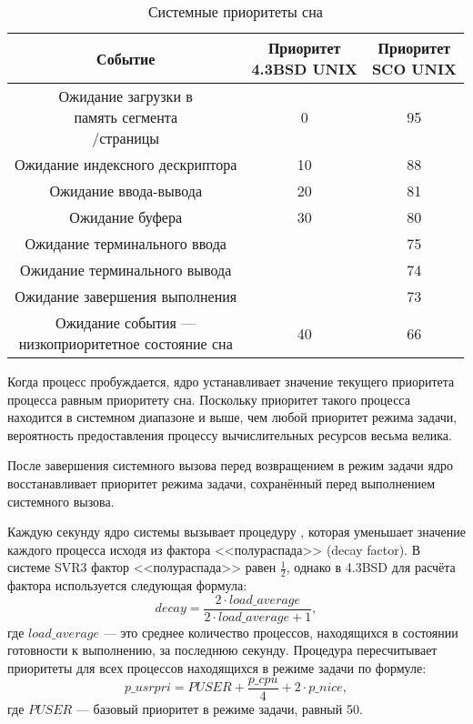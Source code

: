 \begin{table}[H]
  \centering
  \caption{Системные приоритеты сна}
  \begin{tabular}{|c|c|c|}
    \hline
    Событие & \makecell{Приоритет \\4.3BSD UNIX} & \makecell{Приоритет \\SCO UNIX} \\
    \hline
    \makecell{Ожидание загрузки в \\память сегмента\\/страницы} & 0 & 95 \\
    \hline
    Ожидание индексного дескриптора & 10 & 88 \\
    \hline
    Ожидание ввода-вывода & 20 & 81 \\
    \hline
    Ожидание буфера & 30 & 80 \\
    \hline
    Ожидание терминального ввода & & 75 \\
    \hline
    Ожидание терминального вывода & & 74 \\
    \hline
    Ожидание завершения выполнения & & 73 \\
    \hline
    \makecell{Ожидание события --- \\низкоприоритетное состояние сна} & 40 & 66 \\
    \hline
  \end{tabular}
  \label{tbl:sleep}
\end{table}

Когда процесс пробуждается, ядро устанавливает значение текущего приоритета процесса
равным приоритету сна. Поскольку приоритет такого процесса находится в системном 
диапазоне и выше, чем любой приоритет режима задачи, вероятность
предоставления процессу вычислительных ресурсов весьма велика.

После завершения системного вызова перед возвращением в режим задачи
ядро восстанавливает приоритет режима задачи, сохранённый
перед выполнением системного вызова.

Каждую секунду ядро системы вызывает процедуру , которая
уменьшает значение  каждого процесса исходя из фактора <<полураспада>> 
(decay factor). В системе SVR3 фактор <<полураспада>> равен $\frac{1}{2}$, однако в 
4.3BSD для расчёта фактора используется следующая формула:
\begin{equation}
  decay = \frac{2 \cdot load\_average}{2 \cdot load\_average + 1},
\end{equation}
где $load\_average$ --- это среднее количество процессов, находящихся в состоянии 
готовности к выполнению, за последнюю секунду. Процедура  
пересчитывает приоритеты для всех процессов находящихся в режиме задачи по формуле:
\begin{equation}
  p\_usrpri = PUSER + \frac{p\_cpu}{4} + 2 \cdot p\_nice,
\end{equation}
где $PUSER$ --- базовый приоритет в режиме задачи, равный 50.

